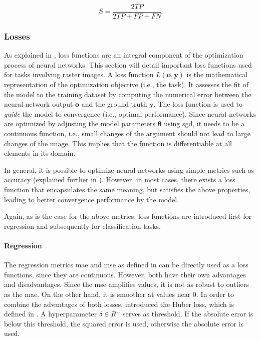 \begin{equation}
\label{eq:dice.coef}
    S=\frac{2TP}{2TP+FP+FN}
\end{equation}

\subsubsection{Losses}
\label{subsubsec:losses}
As explained in , loss functions are an integral component of the optimization process of neural networks. This section will detail important loss functions used for tasks involving raster images. A loss function $L(\mathbf{o},\mathbf{y})$ is the mathematical representation of the optimization objective (i.e., the task). It assesses the fit of the model to the training dataset by computing the numerical error between the neural network output $\mathbf{o}$ and the ground truth $\mathbf{y}$. The loss function is used to \emph{guide} the model to convergence (i.e., optimal performance). Since neural networks are optimized by adjusting the model parameters $\boldsymbol{\theta}$ using \gls{sgd}, it needs to be a continuous function, i.e., small changes of the argument should not lead to large changes of the image. This implies that the function is differentiable at all elements in its domain.

In general, it is possible to optimize neural networks using simple metrics such as accuracy (explained further in ). However, in most cases, there exists a loss function that encapsulates the same meaning, but satisfies the above properties, leading to better convergence performance by the model.

Again, as is the case for the above metrics, loss functions are introduced first for regression and subsequently for classification tasks.

\paragraph{Regression}
\label{p:losses.regression}

The regression metrics \gls{mae} and \gls{mse} as defined in  can be directly used as a loss functions, since they are continuous.
However, both have their own advantages and disadvantages. Since the \gls{mse} amplifies values, it is not as robust to outliers as the \gls{mae}. On the other hand, it is smoother at values near 0. In order to combine the advantages of both losses, \citet{10.1214/aoms/1177703732} introduced the Huber loss, which is defined in . A hyperparameter $\delta\in R^{+}$ serves as threshold. If the absolute error is below this threshold, the squared error is used, otherwise the absolute error is used.

